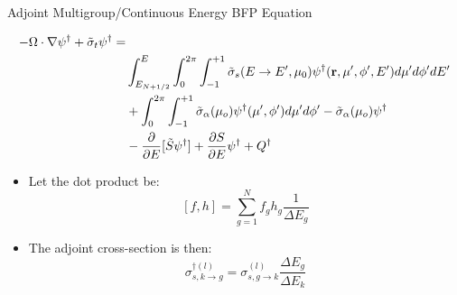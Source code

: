 \documentclass{beamer}
\begin{document}
\begin{frame}{Adjoint Multigroup/Continuous Energy BFP Equation}
 
    \begin{eqnarray*}
      -\Omega \cdot \nabla \psi^{\dagger} + \tilde{\sigma}_t\psi^{\dagger} = & \\
      & \int_{E_{N+1/2}}^{E}\int_{0}^{2\pi}\int_{-1}^{+1} \tilde{\sigma}_s(E\rightarrow E',\mu_0)
       \psi^{\dagger}({\bf r},\mu',\phi',E')d\mu'd\phi'dE' \\
       &+ \int_{0}^{2\pi}\int_{-1}^{+1} \tilde{\sigma}_{\alpha}(\mu_o) \psi^{\dagger}(\mu',\phi')d\mu'd\phi'  - \tilde{\sigma}_{\alpha}(\mu_o)\psi^{\dagger}\\
       &- \frac{\partial}{\partial E} [\tilde{S}\psi^{\dagger}]  + \frac{\partial S}{\partial E} \psi^{\dagger} + Q^{\dagger}
    \end{eqnarray*}

     \begin{itemize}
       \item Let the dot product be: $$ [f,h]=\sum_{g=1}^{N}f_gh_g\frac{1}{\Delta E_g} $$

      \item The adjoint cross-section is then: $$ \sigma_{s,k\to g}^{\dagger(l)} = \sigma_{s,g\to k}^{(l)} \frac{\Delta E_g}{\Delta E_k} $$
       
     \end{itemize}

\end{frame}
\end{document}
